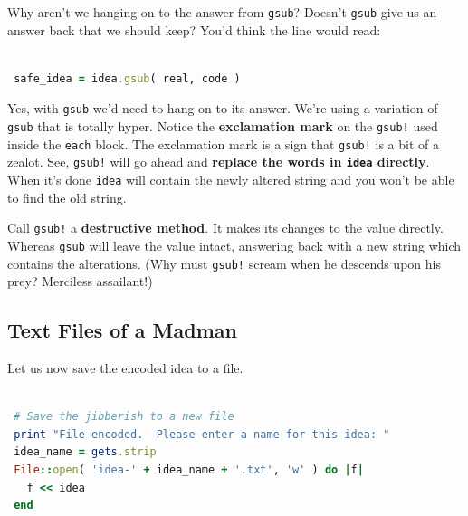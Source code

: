 \documentclass[10pt,twoside]{report}
\begin{document}
Why aren't we hanging on to the answer from
\lstinline[breaklines=true]|gsub|?  Doesn't
\lstinline[breaklines=true]|gsub| give us an answer back that we
should keep?  You'd think the line would read:


\begin{lstlisting}[basicstyle=\ttfamily\color{basiccolor},
    commentstyle = \ttfamily\color{commentcolor},
    keywordstyle=\ttfamily\color{keywordscolor},
    stringstyle=\color{stringcolor},
    language=Ruby,
    basicstyle=\small\ttfamily,
    showstringspaces=false,
  ]

 safe_idea = idea.gsub( real, code )

\end{lstlisting}


Yes, with \lstinline[breaklines=true]|gsub| we'd need to hang on to
its answer.  We're using a variation of
\lstinline[breaklines=true]|gsub| that is totally hyper.  Notice the
{\bf exclamation mark} on the \lstinline[breaklines=true]|gsub!| used
inside the \lstinline[breaklines=true]|each| block.  The exclamation
mark is a sign that \lstinline[breaklines=true]|gsub!| is a bit of a
zealot.  See, \lstinline[breaklines=true]|gsub!| will go ahead and
{\bf replace the words in \lstinline[breaklines=true]|idea| directly}.
When it's done \lstinline[breaklines=true]|idea| will contain the
newly altered string and you won't be able to find the old string.

Call \lstinline[breaklines=true]|gsub!| a {\bf destructive method}.
It makes its changes to the value directly.  Whereas
\lstinline[breaklines=true]|gsub| will leave the value intact,
answering back with a new string which contains the alterations. (Why
must \lstinline[breaklines=true]|gsub!| scream when he descends upon
his prey?  Merciless assailant!)

\newpage



\subsection{Text Files of a Madman}



Let us now save the encoded idea to a file.


\begin{lstlisting}[basicstyle=\ttfamily\color{basiccolor},
    commentstyle = \ttfamily\color{commentcolor},
    keywordstyle=\ttfamily\color{keywordscolor},
    stringstyle=\color{stringcolor},
    language=Ruby,
    basicstyle=\small\ttfamily,
    showstringspaces=false,
  ]

 # Save the jibberish to a new file
 print "File encoded.  Please enter a name for this idea: "
 idea_name = gets.strip
 File::open( 'idea-' + idea_name + '.txt', 'w' ) do |f|
   f << idea
 end

\end{lstlisting}
\end{document}
